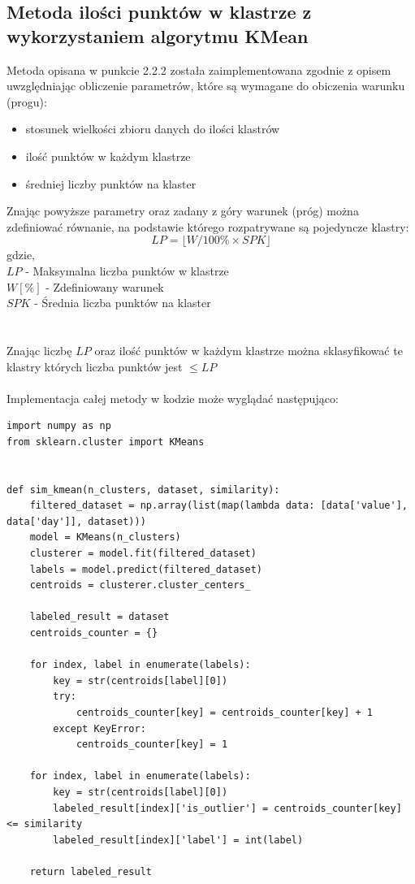 \documentclass[eng,printmode]{mgr}
\begin{document}
\subsection{Metoda ilości punktów w klastrze z wykorzystaniem algorytmu KMean}
Metoda opisana w punkcie 2.2.2 została zaimplementowana zgodnie z opisem uwzględniając obliczenie parametrów, które są wymagane do obiczenia warunku (progu):
\begin{itemize}
	\item stosunek wielkości zbioru danych do ilości klastrów
	\item ilość punktów w każdym klastrze
	\item średniej liczby punktów na klaster
\end{itemize}
Znając powyższe parametry oraz zadany z góry warunek (próg) można zdefiniować równanie, na podstawie którego rozpatrywane są pojedyncze klastry:
\\
\begin{equation*}
LP = \lfloor W / 100\% \times SPK  \rfloor
\end{equation*}
gdzie,\\
$LP$ - Maksymalna liczba punktów w klastrze \\
$W[\%]$ - Zdefiniowany warunek \\
$SPK$ - Średnia liczba punktów na klaster \\
\\\\
Znając liczbę $LP$ oraz ilość punktów w każdym klastrze można sklasyfikować te klastry których liczba punktów jest $\le LP$
\\\\
Implementacja całej metody w kodzie może wyglądać następująco:

\begin{lstlisting}
import numpy as np
from sklearn.cluster import KMeans


def sim_kmean(n_clusters, dataset, similarity):
    filtered_dataset = np.array(list(map(lambda data: [data['value'], data['day']], dataset)))
    model = KMeans(n_clusters)
    clusterer = model.fit(filtered_dataset)
    labels = model.predict(filtered_dataset)
    centroids = clusterer.cluster_centers_

    labeled_result = dataset
    centroids_counter = {}

    for index, label in enumerate(labels):
        key = str(centroids[label][0])
        try:
            centroids_counter[key] = centroids_counter[key] + 1
        except KeyError:
            centroids_counter[key] = 1

    for index, label in enumerate(labels):
        key = str(centroids[label][0])
        labeled_result[index]['is_outlier'] = centroids_counter[key] <= similarity
        labeled_result[index]['label'] = int(label)

    return labeled_result
\end{lstlisting}
\end{document}
